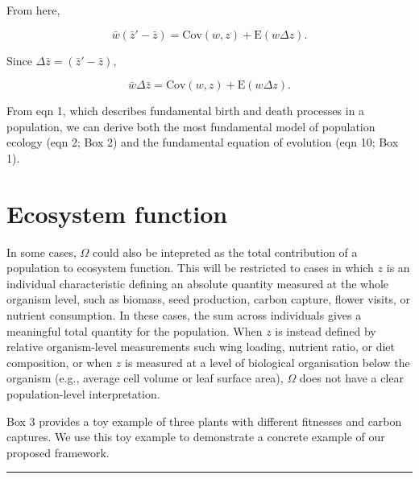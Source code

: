 \documentclass[
]{article}
\begin{document}
From here,

\[\bar{w}\left(\bar{z}' - \bar{z}\right) = \mathrm{Cov}\left(w ,z \right) + \mathrm{E}\left( w \Delta z  \right).\]

Since \(\Delta \bar{z} = \left(\bar{z}' - \bar{z}\right)\),

\[\bar{w}\Delta \bar{z} = \mathrm{Cov}\left(w ,z \right) + \mathrm{E}\left( w \Delta z  \right).
\tag{10}
\]

From eqn 1, which describes fundamental birth and death processes in a
population, we can derive both the most fundamental model of population
ecology (eqn 2; Box 2) and the fundamental equation of evolution (eqn
10; Box 1).

\section{Ecosystem function}\label{ecosystem-function}

In some cases, \(\Omega\) could also be intepreted as the total
contribution of a population to ecosystem function. This will be
restricted to cases in which \(z\) is an individual characteristic
defining an absolute quantity measured at the whole organism level, such
as biomass, seed production, carbon capture, flower visits, or nutrient
consumption. In these cases, the sum across individuals gives a
meaningful total quantity for the population. When \(z\) is instead
defined by relative organism-level measurements such wing loading,
nutrient ratio, or diet composition, or when \(z\) is measured at a
level of biological organisation below the organism (e.g., average cell
volume or leaf surface area), \(\Omega\) does not have a clear
population-level interpretation.

Box 3 provides a toy example of three plants with different fitnesses
and carbon captures. We use this toy example to demonstrate a concrete
example of our proposed framework.

\begin{center}\rule{0.5\linewidth}{0.5pt}\end{center}
\end{document}
